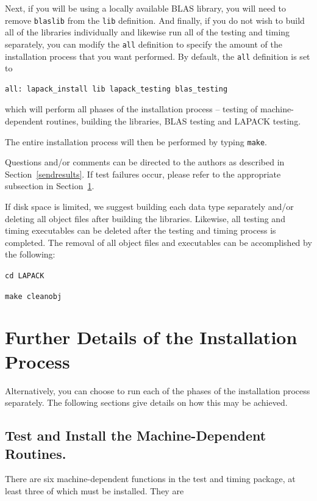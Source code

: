 \documentclass[11pt]{report}
\begin{document}
Next, if you will be using a locally available BLAS library, you will need
to remove \texttt{blaslib} from the \texttt{lib} definition.  And finally,
if you do not wish to build all of the libraries individually and
likewise run all of the testing and timing separately, you can
modify the \texttt{all} definition to specify the amount of the
installation process that you want performed.  By default,
the \texttt{all} definition is set to
\begin{verbatim}
all: lapack_install lib lapack_testing blas_testing
\end{verbatim}
which will perform all phases of the installation
process -- testing of machine-dependent routines, building the libraries,
BLAS testing and LAPACK testing.

The entire installation process will then be performed by typing
\texttt{make}.

Questions and/or comments can be directed to the
authors as described in Section~\ref{sendresults}.  If test failures
occur, please refer to the appropriate subsection in
Section~\ref{furtherdetails}.

If disk space is limited, we suggest building each data type separately
and/or deleting all object files after building the libraries.  Likewise, all
testing and timing executables can be deleted after the testing and timing
process is completed.  The removal of all object files and executables
can be accomplished by the following:

\begin{list}{}{}
\item \texttt{cd LAPACK}
\item \texttt{make cleanobj}
\end{list}

\section{Further Details of the Installation Process}\label{furtherdetails}

Alternatively, you can choose to run each of the phases of the
installation process separately.  The following sections give details
on how this may be achieved.

\subsection{Test and Install the Machine-Dependent Routines.}

There are six machine-dependent functions in the test and timing
package, at least three of which must be installed.  They are
\end{document}

